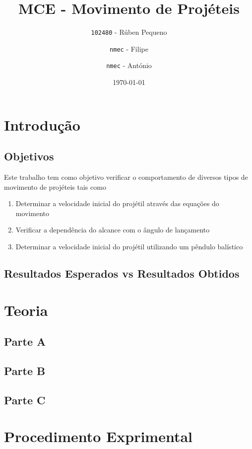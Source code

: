 \documentclass{report}
\title{MCE - Movimento de Projéteis}
\author{\texttt{102480} - Rúben Pequeno
\and 
\texttt{nmec} - Filipe
\and
\texttt{nmec} - António}
\date{\today}
\begin{document}
\maketitle

\tableofcontents
\newpage

\chapter{Introdução}

\section{Objetivos}
	Este trabalho tem como objetivo verificar o comportamento de diversos tipos de movimento de projéteis tais como 
	\renewcommand{\theenumi}{\Alph{enumi}}
	\begin{enumerate}
		\item{Determinar a velocidade inicial do projétil através das equações do movimento}
		\item{Verificar a dependência do alcance com o ângulo de lançamento}
		\item{Determinar a velocidade inicial do projétil utilizando um pêndulo balístico}
	\end{enumerate}


\section{Resultados Esperados vs Resultados Obtidos}
	

\chapter{Teoria}

\section{Parte A}

\section{Parte B}

\section{Parte C}

\chapter{Procedimento Exprimental}
\end{document}
